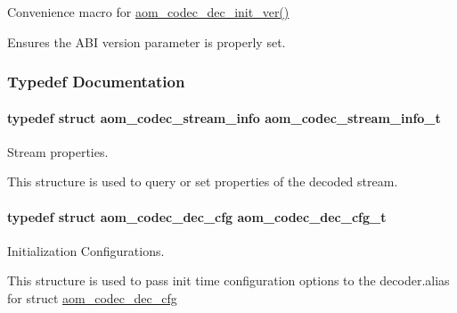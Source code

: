 Convenience macro for \hyperlink{group__decoder_gab2bfd2f5517b9452d2c71b7c2b2e8e8d}{aom\+\_\+codec\+\_\+dec\+\_\+init\+\_\+ver()} 

Ensures the A\+BI version parameter is properly set. 

\subsubsection{Typedef Documentation}
\paragraph[{\texorpdfstring{aom\+\_\+codec\+\_\+stream\+\_\+info\+\_\+t}{aom_codec_stream_info_t}}]{\setlength{\rightskip}{0pt plus 5cm}typedef struct {\bf aom\+\_\+codec\+\_\+stream\+\_\+info}  {\bf aom\+\_\+codec\+\_\+stream\+\_\+info\+\_\+t}}\hypertarget{group__decoder_gab348c42a78bbbaa6488c84cdf3a28aaa}{}\label{group__decoder_gab348c42a78bbbaa6488c84cdf3a28aaa}


Stream properties. 

This structure is used to query or set properties of the decoded stream. 
\paragraph[{\texorpdfstring{aom\+\_\+codec\+\_\+dec\+\_\+cfg\+\_\+t}{aom_codec_dec_cfg_t}}]{\setlength{\rightskip}{0pt plus 5cm}typedef struct {\bf aom\+\_\+codec\+\_\+dec\+\_\+cfg}  {\bf aom\+\_\+codec\+\_\+dec\+\_\+cfg\+\_\+t}}\hypertarget{group__decoder_ga629c80380a9351796022345f655a5f3d}{}\label{group__decoder_ga629c80380a9351796022345f655a5f3d}


Initialization Configurations. 

This structure is used to pass init time configuration options to the decoder.\+alias for struct \hyperlink{structaom__codec__dec__cfg}{aom\+\_\+codec\+\_\+dec\+\_\+cfg} 


